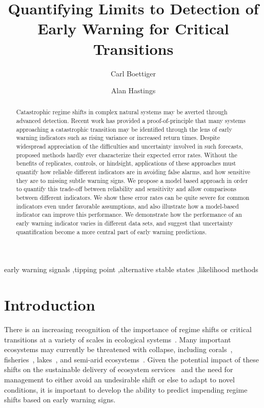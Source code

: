 \documentclass[authoryear,review,11pt]{elsarticle}
\begin{document}
\begin{frontmatter}
  \title{Quantifying Limits to Detection of Early Warning for Critical Transitions}
  \author[cpb]{Carl Boettiger}
  \author[esp]{Alan Hastings}
  \address[cpb]{Center for Population Biology, 1 Shields Avenue, University of California, Davis, CA, 95616 United States.}
  \address[esp]{Department of Environmental Science and Policy, University of California, Davis, CA, 95616 United States}


  \begin{abstract}

Catastrophic regime shifts in complex natural systems may be averted through advanced detection.
Recent work has provided a proof-of-principle that many systems approaching a catastrophic transition may be identified
through the lens of early warning indicators such as rising variance or increased return times.
Despite widespread appreciation of the difficulties and uncertainty involved in such forecasts,
proposed methods hardly ever characterize their expected error rates. 
Without the benefits of replicates, controls, or hindsight, 
applications of these approaches must quantify how reliable different indicators are in avoiding false alarms,
and how sensitive they are to missing subtle warning signs.
We propose a model based approach in order to quantify this trade-off between reliability and sensitivity
and allow comparisons between different indicators.
We show these error rates can be quite severe for common indicators even under favorable assumptions,
and also illustrate how a model-based indicator can improve this performance. 
We demonstrate how the performance of an early warning indicator varies in different data sets, 
and suggest that uncertainty quantification become a more central part of early warning predictions.  
  \end{abstract}

  \begin{keyword}
early warning signals \sep tipping point \sep alternative stable states \sep likelihood methods
   \end{keyword}
 \end{frontmatter}

\section{Introduction}
There is an increasing recognition of the importance of regime shifts or critical transitions at a variety of scales in ecological systems~\citep{Holling1973, Wissel1984, Scheffer2001, Scheffer2009, Drake2010, Carpenter2011}⁠.
Many important ecosystems may currently be threatened with collapse, including corals~\citep{Bellwood2004}, fisheries~\citep{Berkes2006}⁠, lakes~\citep{Carpenter2011}, and semi-arid ecosystems~\citep{Kefi2007}⁠.
Given the potential impact of  these shifts on the sustainable delivery of ecosystem services~\citep{Folke2004}
and the need for management to either avoid an undesirable shift or else to adapt to novel conditions,
it is important to develop the ability to predict impending regime shifts based on early warning signs.
\end{document}

